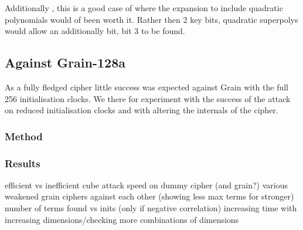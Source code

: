 \documentclass{report}
\let\Oldsubsection\subsection
\renewcommand{\subsection}{\FloatBarrier\Oldsubsection}
\let\Oldsubsubsection\subsubsection
\renewcommand{\subsubsection}{\FloatBarrier\Oldsubsubsection}
\begin{document}
Additionally , this is a good case of where the expansion to include quadratic polynomials would of been worth it. Rather then 2 key bits, quadratic superpolys would allow an additionally bit, bit 3 to be found.
\subsection{Against Grain-128a}
As a fully fledged cipher little success was expected against Grain with the full 256 initialisation clocks. We there for experiment with the success of the attack on reduced initialisation clocks and with altering the internals of the cipher.
\subsubsection{Method}
\subsubsection{Results}
efficient vs inefficient cube attack speed on dummy cipher
(and grain?)
various weakened grain ciphers against each other (showing less max terms for stronger)
number of terms found vs inits (only if negative correlation)
increasing time with increasing dimensions/checking more combinations of dimensions
\end{document}
